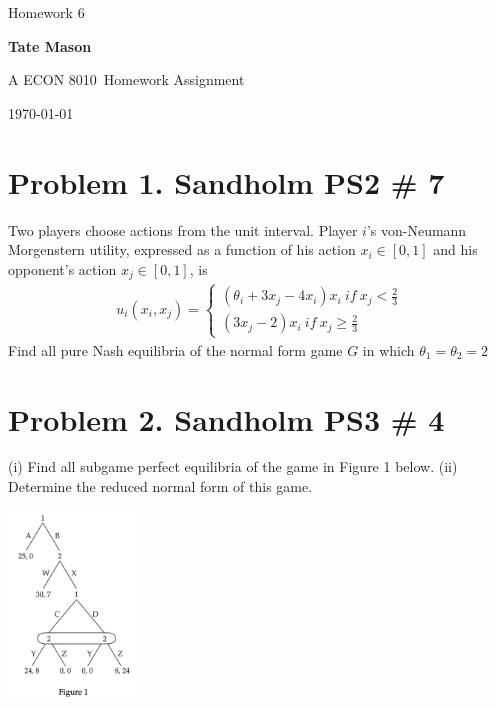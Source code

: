 \documentclass[10pt, a4paper]{article}
\newcommand\course{ECON 8010}                            %
\newcommand\hwnumber{6}                                  %
\newcommand\Information{Tate Mason}                        %
\begin{document}
  \begin{titlepage}
    \begin{center}
      \vspace*{3cm}
            
        \vspace{1cm}
        \huge
        Homework \hwnumber
            
        \vspace{1.5cm}
        \Large
            
        \textbf{\Information}                      %
            
        \vfill
        
        A \course \ Homework Assignment
            
        \vspace{1cm}
        \Large

        
        \today
            
    \end{center}
  \end{titlepage}

  \newpage
\section*{Problem 1. Sandholm PS2 \# 7}
  Two players choose actions from the unit interval. Player $i$'s von-Neumann Morgenstern utility, expressed as a function of his action $x_i\in[0,1]$ and his opponent's action $x_j\in[0,1]$, is 
    \begin{gather*}
      u_i(x_i,x_j) = \begin{cases}
        (\theta_i+3x_j-4x_i)x_i \ if \ x_j<\frac{2}{3}\\
        (3x_j-2)x_i \ if \ x_j\geq\frac{2}{3}
      \end{cases}
    \end{gather*}
    Find all pure Nash equilibria of the normal form game $G$ in which $\theta_1=\theta_2=2$ 
\section*{Problem 2. Sandholm PS3 \# 4}
  (i) Find all subgame perfect equilibria of the game in Figure 1 below.
  (ii) Determine the reduced normal form of this game. 
  \begin{center}
    \includegraphics[width = 0.25\textwidth]{fig1.png}
  \end{center}
\end{document}
